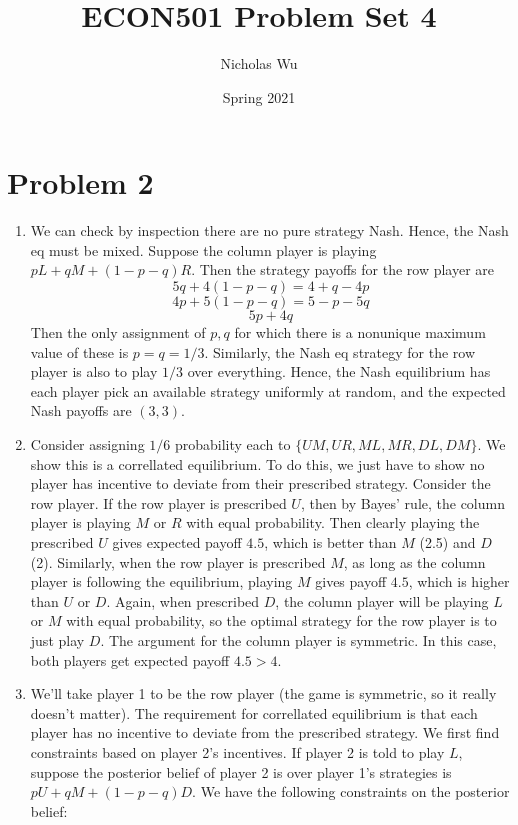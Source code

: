 \documentclass[10pt,letter]{article}
\begin{document}


\title{ECON501 Problem Set 4}

\author{Nicholas Wu}

\date{Spring 2021}

\maketitle

\section*{Problem 2}
\begin{enumerate}[label=(\alph*)]
\item We can check by inspection there are no pure strategy Nash. Hence, the Nash eq must be mixed. Suppose the column player is playing $p L + q M + (1-p-q)R$. Then the strategy payoffs for the row player are
\[5q + 4(1-p-q) = 4 + q - 4p \]
\[4p + 5(1-p-q) = 5 - p - 5q \]
\[5p + 4q \]
Then the only assignment of $p, q$ for which there is a nonunique maximum value of these is $p = q = 1/3$. Similarly, the Nash eq strategy for the row player is also to play $1/3$ over everything. Hence, the Nash equilibrium has each player pick an available strategy uniformly at random, and the expected Nash payoffs are $(3,3)$.
\item Consider assigning $1/6$ probability each to $\{ UM, UR, ML, MR, DL, DM \}$. We show this is a correllated equilibrium. To do this, we just have to show no player has incentive to deviate from their prescribed strategy. Consider the row player. If the row player is prescribed $U$, then by Bayes' rule, the column player is playing $M$ or $R$ with equal probability. Then clearly playing the prescribed $U$ gives expected payoff $4.5$, which is better than $M$ (2.5) and $D$ (2). Similarly, when the row player is prescribed $M$, as long as the column player is following the equilibrium, playing $M$ gives payoff $4.5$, which is higher than $U$ or $D$. Again, when prescribed $D$, the column player will be playing $L$ or $M$ with equal probability, so the optimal strategy for the row player is to just play $D$. The argument for the column player is symmetric. In this case, both players get expected payoff $4.5 > 4$.
\item We'll take player 1 to be the row player (the game is symmetric, so it really doesn't matter). The requirement for correllated equilibrium is that each player has no incentive to deviate from the prescribed strategy. We first find constraints based on player 2's incentives. If player 2 is told to play $L$, suppose the posterior belief of player 2 is over player 1's strategies is $pU + qM + (1-p-q)D$. We have the following constraints on the posterior belief:

\end{enumerate}
\end{document}
